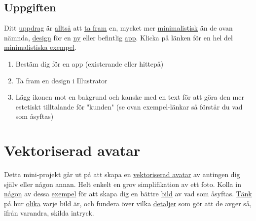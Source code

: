\documentclass{article}
\begin{document}
    \subsection*{ Uppgiften }
      Ditt
      \href{http://dribbble.com/shots/1013293-App-Branding?list=searches}{uppdrag}
      är
      \href{http://dribbble.com/shots/988508-Simple-iOS-Icons?list=searches}{alltså}
      att 
      \href{http://dribbble.com/shots/1043059-iDo-app-icon?list=searches}{ta fram}
      en, mycket mer
      \href{http://dribbble.com/shots/1139639-Heart-Icon?list=searches}{minimalistisk}
      än de ovan nämnda,
      \href{http://www.behance.net/gallery/Transparent-App-Icon/10898437}{design}
      för en
      \href{http://www.behance.net/gallery/Simple-Weather-App/10738379}{ny}
      eller befintlig
      \href{http://www.behance.net/gallery/Flat-icon/10071269}{app}.
      Klicka på länken för en hel del
      \href{http://dribbble.com/genuinejake/projects/140562-iOS-Icons}{minimalistiska exempel}.
      \begin{enumerate}
        \item Bestäm dig för en app (existerande eller hittepå)
        \item Ta fram en design i Illustrator
        \item Lägg ikonen mot en bakgrund och kanske med en text för att göra den mer estetiskt tilltalande för "kunden" (se ovan exempel-länkar så förstår du vad som åsyftas)
      \end{enumerate}



  \newpage
  \section{ Vektoriserad avatar }
    \paragraph{}
    Detta mini-projekt går ut på att skapa en
    \href{http://vector.tutsplus.com/tutorials/tools-tips/quick-tip-rapid-vector-portrait-process/}{vektoriserad avatar}
    av antingen dig själv eller någon annan. Helt enkelt en grov simplifikation av ett foto. Kolla in
    \href{http://chiragtheoo7.deviantart.com/art/vector-girl-face-173563059}{någon}
    av dessa
    \href{http://fad02fad.deviantart.com/art/Marilyn-Monroe-354215090}{exempel}
    för att skapa dig en bättre
    \href{http://oddhouse.deviantart.com/art/Portrait-70809410}{bild}
    av vad som åsyftas.
    \href{http://foolecho.deviantart.com/art/Be-188800517}{Tänk}
    på hur
    \href{http://j3concepts.deviantart.com/art/Self-Portrait-April-09-117753384}{olika}
    varje bild är, och fundera över vilka
    \href{http://farm2.static.flickr.com/1336/5163223561_ce4751bb83.jpg}{detaljer}
    som gör att de avger så, ifrån varandra, skilda intryck.
\end{document}

